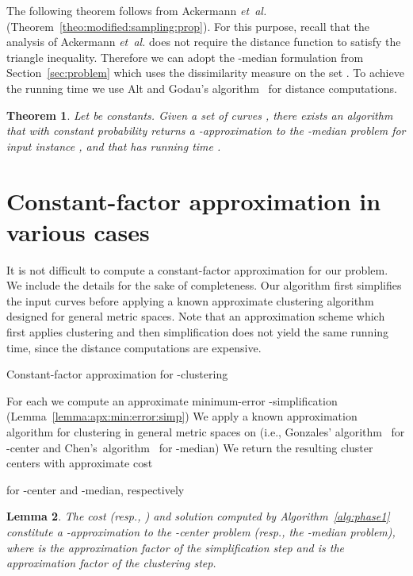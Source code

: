 \documentclass[11pt, letter]{article}
\newcommand{\etal}{\textit{e{}t~a{}l.}\xspace}
\newtheorem{theorem}{Theorem}[section]
\newtheorem{lemma}[theorem]{Lemma}
\newcommand{\seclab}[1]{\label{sec:#1}}
\newcommand{\secref}[1]{Section~\ref{sec:#1}}
\newcommand{\thmlab}[1]{{\label{theo:#1}}}
\newcommand{\thmref}[1]{Theorem~\ref{theo:#1}}
\newcommand{\lemlab}[1]{\label{lemma:#1}}
\newcommand{\lemref}[1]{Lemma~\ref{lemma:#1}}
\newcommand{\alglab}[1]{\label{alg:#1}}
\newcommand{\algref}[1]{Algorithm~\ref{alg:#1}}
\begin{document}
The following theorem follows from Ackermann \etal~\cite{abs-cm-10} (\thmref{modified:sampling:prop}).
For this purpose, recall that the analysis of Ackermann \etal does not require the distance function 
to satisfy the triangle inequality. Therefore we can adopt the -median formulation from 
\secref{problem} which uses the dissimilarity measure  on the set . 
To achieve the running time we use Alt and Godau's algorithm~\cite{ag-cfdbt-95} for distance computations.




\begin{theorem}\thmlab{k:l:median:main}
Let  be constants.
Given a set of curves , there exists an algorithm that with
constant probability returns a -approximation to the
-median problem for input instance , and that
has running time .
\end{theorem}



\section{Constant-factor approximation in various cases}
\seclab{cf:approx:uni}

It is not difficult to compute a constant-factor approximation for our problem.
We include the details for the sake of completeness. Our algorithm first
simplifies the input curves before applying a known approximate clustering algorithm
designed for general metric spaces.  Note that an approximation scheme which
first applies clustering and then simplification does not yield the same
running time, since the distance computations are expensive.

\begin{algorithm}[h]\alglab{phase1}
 \caption{Constant-factor approximation for -clustering}
For each  we compute an approximate minimum-error
-simplification  (\lemref{apx:min:error:simp})\;
We apply a known approximation algorithm for clustering in general metric spaces
on  (i.e.,
Gonzales' algorithm~\cite{Gonzalez1985} for -center and
Chen's~algorithm~\cite{c-kmc-09} for -median)\; 
We return the resulting cluster centers
 with approximate cost 

for -center and -median, respectively\;
\end{algorithm}

\begin{lemma}\lemlab{c:f:approx}
The cost  (resp., ) and solution  computed by \algref{phase1} constitute a
-approximation to the
-center problem (resp., the
-median problem), where  is the approximation
factor of the simplification step and  is the approximation factor of
the clustering step. 
\end{lemma}
\end{document}
